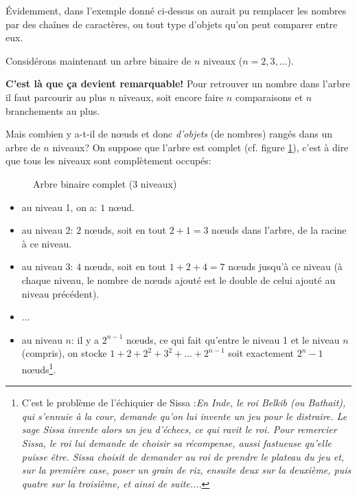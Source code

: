 Évidemment, dans l'exemple donné ci-dessus on aurait pu remplacer les
nombres par des chaînes de caractères, ou tout type d'objets qu'on
peut comparer entre eux.

Considérons maintenant un arbre binaire de $n$ niveaux ($n =
2,3,...$).

\textbf{ C'est là que ça devient remarquable!}
Pour retrouver un nombre dans l'arbre il faut parcourir au plus $n$
niveaux, soit encore faire $n$ comparaisons et $n$ branchements au
plus.

Mais combien y a-t-il de  n{\oe}uds et donc \emph{d'objets} (de nombres)
  rangés dans un 
arbre de $n$ niveaux? On suppose que l'arbre est complet (cf. figure
\ref{gcomplet}), c'est à dire que tous les niveaux sont complètement
occupés:

\begin{center}
\begin{figure}
\caption{Arbre binaire complet (3 niveaux)}\label{gcomplet}
\end{figure}
\end{center}

\begin{itemize}
\item au niveau 1, on a: $1$  n{\oe}ud.
\item au niveau 2: $2$  n{\oe}uds, soit en tout $2+1 =3$  n{\oe}uds
  dans l'arbre, de la racine à ce niveau.
\item au niveau 3: $4$  n{\oe}uds, soit en tout $1+ 2 +4 = 7$
  n{\oe}uds jusqu'à ce niveau (à chaque niveau, le nombre de
  n{\oe}uds ajouté est le double de celui ajouté au niveau précédent).
\item ...
\item au niveau $n$: il y a $2^{n-1}$ n{\oe}uds, ce qui fait qu'entre
  le niveau 1 et le niveau $n$ (compris), on stocke
  $1 +2 + 2^2 + 3^2+ \ldots+ 2^{n-1}$ soit   exactement $2^n - 1$
  n{\oe}uds\footnote{C'est le problème de l'échiquier de Sissa
    \cite{sissa}:\textit{\og En Inde, le roi Belkib (ou Bathait), qui
      s'ennuie à la cour, demande qu'on lui invente un jeu pour le
      distraire. Le sage Sissa invente alors un jeu d'échecs, ce qui
      ravit le roi. Pour remercier Sissa, le roi lui demande de
      choisir sa récompense, aussi fastueuse qu'elle puisse
      être. Sissa choisit de demander au roi de prendre le plateau du
      jeu et, sur la première case, poser un grain de riz, ensuite
      deux sur la deuxième, puis quatre sur la troisième, et ainsi de
      suite...\fg}.}. 
\end{itemize}

